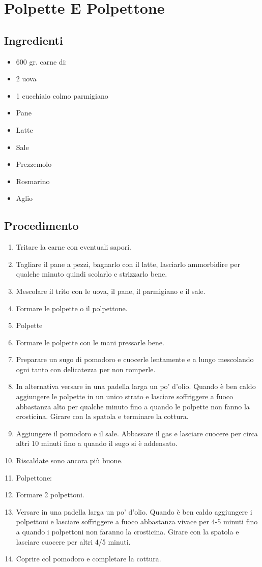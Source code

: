 \section{Polpette E Polpettone}
\subsection{Ingredienti}
\begin{itemize}
\item 600 gr. carne di:   
\item 2 uova  
\item 1 cucchiaio colmo parmigiano  
\item Pane  
\item Latte  
\item Sale  
\item Prezzemolo  
\item Rosmarino  
\item Aglio
\end{itemize}
\subsection{Procedimento}
\begin{enumerate}
\item  Tritare la carne con eventuali sapori.  
\item  Tagliare il pane a pezzi, bagnarlo con il latte, lasciarlo ammorbidire per qualche minuto quindi scolarlo e strizzarlo bene.  
\item  Mescolare il trito con le uova, il pane, il parmigiano e il sale.   
\item  Formare le polpette o il polpettone.  
\item  Polpette  
\item  Formare le polpette con le mani pressarle bene.  
\item  Preparare un sugo di pomodoro e cuocerle lentamente e a lungo mescolando ogni tanto con delicatezza per non romperle.   
\item  In alternativa versare in una padella larga un po' d'olio. Quando è ben caldo aggiungere le polpette in un unico strato e lasciare soffriggere a fuoco abbastanza alto per qualche minuto fino a quando le polpette non fanno la crosticina. Girare con la spatola e terminare la cottura.  
\item  Aggiungere il pomodoro e il sale. Abbassare il gas e lasciare cuocere per circa altri 10 minuti fino a quando il sugo si è addensato.  
\item  Riscaldate sono ancora più buone.  
\item  Polpettone:  
\item  Formare 2 polpettoni.  
\item  Versare in una padella larga un po' d'olio. Quando è ben caldo aggiungere i polpettoni e lasciare soffriggere a fuoco abbastanza vivace per 4-5 minuti fino a quando i polpettoni non faranno la crosticina. Girare con la spatola e lasciare cuocere per altri 4/5 minuti.  
\item  Coprire col pomodoro e completare la cottura.
\end{enumerate}

